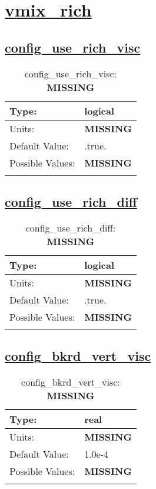 \section[vmix\_rich]{\hyperref[sec:nm_tab_vmix_rich]{vmix\_rich}}
\label{sec:nm_sec_vmix_rich}
\subsection[config\_use\_rich\_visc]{\hyperref[sec:nm_tab_vmix_rich]{config\_use\_rich\_visc}}
\label{subsec:nm_sec_config_use_rich_visc}
\begin{center}
\begin{longtable}{| p{2.0in} | p{4.0in} |}
    \hline
    Type: & logical \\
    \hline
    Units: & {\bf \color{red} MISSING} \\
    \hline
    Default Value: & .true. \\
    \hline
    Possible Values: & {\bf \color{red} MISSING} \\
    \hline
    \caption{config\_use\_rich\_visc: {\bf \color{red} MISSING}}
\end{longtable}
\end{center}
\subsection[config\_use\_rich\_diff]{\hyperref[sec:nm_tab_vmix_rich]{config\_use\_rich\_diff}}
\label{subsec:nm_sec_config_use_rich_diff}
\begin{center}
\begin{longtable}{| p{2.0in} | p{4.0in} |}
    \hline
    Type: & logical \\
    \hline
    Units: & {\bf \color{red} MISSING} \\
    \hline
    Default Value: & .true. \\
    \hline
    Possible Values: & {\bf \color{red} MISSING} \\
    \hline
    \caption{config\_use\_rich\_diff: {\bf \color{red} MISSING}}
\end{longtable}
\end{center}
\subsection[config\_bkrd\_vert\_visc]{\hyperref[sec:nm_tab_vmix_rich]{config\_bkrd\_vert\_visc}}
\label{subsec:nm_sec_config_bkrd_vert_visc}
\begin{center}
\begin{longtable}{| p{2.0in} | p{4.0in} |}
    \hline
    Type: & real \\
    \hline
    Units: & {\bf \color{red} MISSING} \\
    \hline
    Default Value: & 1.0e-4 \\
    \hline
    Possible Values: & {\bf \color{red} MISSING} \\
    \hline
    \caption{config\_bkrd\_vert\_visc: {\bf \color{red} MISSING}}
\end{longtable}
\end{center}
